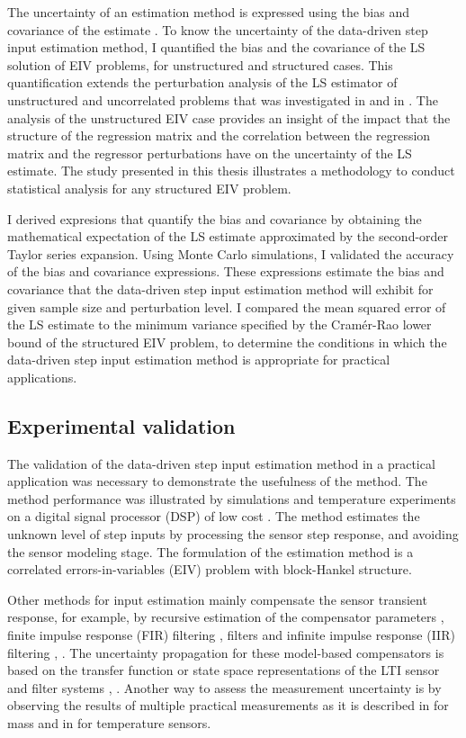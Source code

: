 The uncertainty of an estimation method is expressed using the bias and covariance of the estimate \citep{Pintelon12Book}.
To know the uncertainty of the data-driven step input estimation method, I quantified the bias and the covariance of the LS solution of EIV problems, for unstructured and structured cases. 
This quantification extends the perturbation analysis of the LS estimator of unstructured and uncorrelated problems that was investigated in \citep{Stewart90SPT} and in \citep{Vaccaro94}.
The analysis of the unstructured EIV case provides an insight of the impact that the structure of the regression matrix and the correlation between the regression matrix and the regressor perturbations have on the uncertainty of the LS estimate.
The study presented in this thesis illustrates a methodology to conduct statistical analysis for any structured EIV problem.

I derived expresions that quantify the bias and covariance by obtaining the mathematical expectation of the LS estimate approximated by the second-order Taylor series expansion.
Using Monte Carlo simulations, I validated the accuracy of the bias and covariance expressions.
These expressions estimate the bias and covariance that the data-driven step input estimation method will exhibit for given sample size and perturbation level.
I compared the mean squared error of the LS estimate to the minimum variance specified by the Cram\'er-Rao lower bound of the structured EIV problem, to determine the conditions in which the data-driven step input estimation method is appropriate for practical applications.


\subsection{Experimental validation}

The validation of the data-driven step input estimation method in a practical application was necessary to demonstrate the usefulness of the method.
The method performance was illustrated by simulations and temperature experiments on a digital signal processor (DSP) of low cost \citep{Markovsky15cep}.
The method estimates the unknown level of step inputs by processing the sensor step response, and 
avoiding the sensor modeling stage.
The formulation of the estimation method is a correlated errors-in-variables (EIV) problem with block-Hankel structure.

Other methods for input estimation mainly compensate the sensor transient response, for example, by 
recursive estimation of the compensator parameters \citep{Shu93}, 
finite impulse response (FIR) filtering \citep{Elster07}, \citep{Niedzwiecki16b} filters and 
infinite impulse response (IIR) filtering \citep{Pintelon90}, \citep{Elster08}.
The uncertainty propagation for these model-based compensators is based on the transfer function or state space representations of the LTI sensor and filter systems \citep{Link09}, \citep{Hale09}.
Another way to assess the measurement uncertainty is by observing the results of multiple practical measurements as it is described in \citep{Pietrzak14} for mass and in \citep{Ogorevc16} for temperature sensors.

